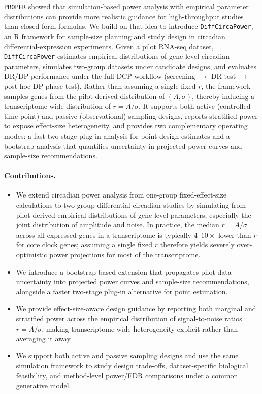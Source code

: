 \documentclass{article}
\newcommand{\software}[1]{\texttt{#1}}
\begin{document}
\software{PROPER} \cite{wu2015proper} showed that simulation-based power analysis with empirical parameter distributions can provide more realistic guidance for high-throughput studies than closed-form formulas. We build on that idea to introduce \software{DiffCircaPower}, an R framework for sample-size planning and study design in circadian differential-expression experiments. Given a pilot RNA-seq dataset, \software{DiffCircaPower} estimates empirical distributions of gene-level circadian parameters, simulates two-group datasets under candidate designs, and evaluates DR/DP performance under the full DCP workflow (screening $\rightarrow$ DR test $\rightarrow$ post-hoc DP phase test). Rather than assuming a single fixed $r$, the framework samples genes from the pilot-derived distribution of $(A,\sigma)$, thereby inducing a transcriptome-wide distribution of $r=A/\sigma$. It supports both active (controlled-time point) and passive (observational) sampling designs, reports stratified power to expose effect-size heterogeneity, and provides two complementary operating modes: a fast two-stage plug-in analysis for point design estimates and a bootstrap analysis that quantifies uncertainty in projected power curves and sample-size recommendations.

\paragraph{Contributions.}
\begin{itemize}
\item We extend circadian power analysis from one-group fixed-effect-size calculations to two-group differential circadian studies by simulating from pilot-derived empirical distributions of gene-level parameters, especially the joint distribution of amplitude and noise. In practice, the median $r=A/\sigma$ across all expressed genes in a transcriptome is typically $4$--$10\times$ lower than $r$ for core clock genes; assuming a single fixed $r$ therefore yields severely over-optimistic power projections for most of the transcriptome.
\item We introduce a bootstrap-based extension that propagates pilot-data uncertainty into projected power curves and sample-size recommendations, alongside a faster two-stage plug-in alternative for point estimation.
\item We provide effect-size-aware design guidance by reporting both marginal and stratified power across the empirical distribution of signal-to-noise ratios $r=A/\sigma$, making transcriptome-wide heterogeneity explicit rather than averaging it away.
\item We support both active and passive sampling designs and use the same simulation framework to study design trade-offs, dataset-specific biological feasibility, and method-level power/FDR comparisons under a common generative model.
\end{itemize}
\end{document}
